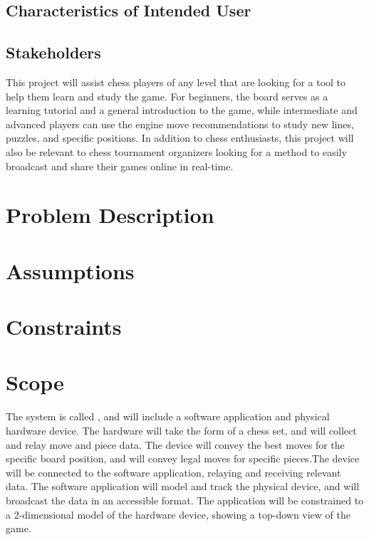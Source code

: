 \documentclass[12pt]{article}
\begin{document}
\subsection{Characteristics of Intended User}
\subsection{Stakeholders}
{This project will assist chess players of any level that are looking for a tool to help them learn and study the game. For beginners, 
the board serves as a learning tutorial and a general introduction to the game, while intermediate and advanced players can use the 
engine move recommendations to study new lines, puzzles, and specific positions. In addition to chess enthusiasts, this project will 
also be relevant to chess tournament organizers looking for a method to easily broadcast and share their games online in real-time. }

\section{Problem Description}

\section{Assumptions}

\section{Constraints}

\section{Scope}
{The system is called \progname{}, and will include a software application and physical hardware device. The hardware will take the 
form of a chess set, and will collect and relay move and piece data. The device will convey the best moves for the specific board 
position, and will convey legal moves for specific pieces.The device will be connected to the software application, relaying and 
receiving relevant data. The software application will model and track the physical device, and will broadcast the data in an accessible 
format. The application will be constrained to a 2-dimensional model of the hardware device, showing a top-down view of the game.}
\end{document}
